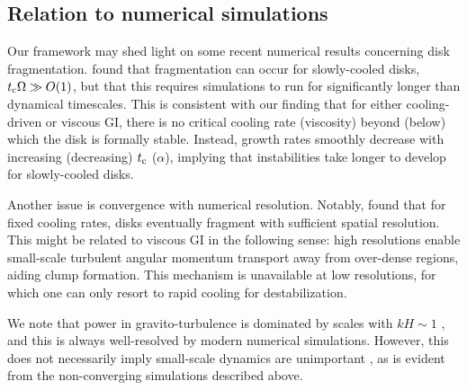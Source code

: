 \subsection{Relation to numerical simulations}\label{prev_works}
Our framework may shed light on 
some recent numerical results concerning disk
fragmentation.  \cite{paardekooper12} found that fragmentation can occur for 
slowly-cooled disks, $t_\mathrm{c}\Omega\gg O(1)$, but that this requires  
simulations to run for significantly longer than dynamical 
timescales. This is consistent with our finding
that for either cooling-driven or viscous GI, there is no critical 
cooling rate (viscosity) beyond (below) which the disk is  
formally stable. Instead, growth rates smoothly decrease with
increasing (decreasing) $t_\mathrm{c}$ ($\alpha$), implying that
instabilities take longer to develop for slowly-cooled disks.        

Another issue is convergence with numerical resolution. Notably, 
\cite{baehr15} found that for fixed cooling rates, disks eventually 
fragment with sufficient spatial resolution. %
This might be related to viscous GI in the following sense: high
resolutions enable small-scale turbulent angular momentum transport
away from over-dense regions, aiding clump formation. This 
mechanism is unavailable at low resolutions, for which one can only
resort to rapid cooling for destabilization.       
 
We note that power in gravito-turbulence is dominated by scales with
$kH\sim 1$ \citep{cossins09}, and this is always  
well-resolved by modern numerical simulations. However, this does not
necessarily imply small-scale dynamics are unimportant \citep[especially for non-linear evolution, see][]{young15}, 
as is evident from the non-converging simulations described above.   


